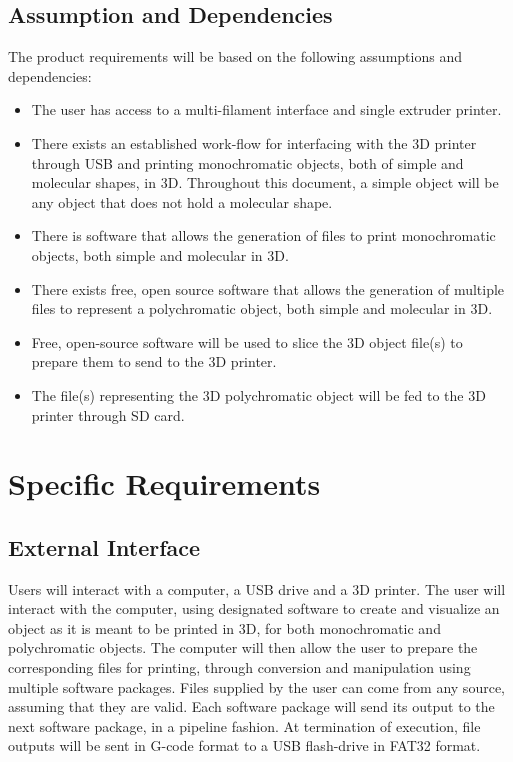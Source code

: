\documentclass[letterpaper, onecolumn, draftclsnofoot, 10pt, compsoc]{IEEEtran}
\begin{document}
\subsection{Assumption and Dependencies} %
The product requirements will be based on the following assumptions and dependencies: 
\begin{itemize}
 \item The user has access to a multi-filament interface and single extruder printer.
  \item There exists an established work-flow for interfacing with the 3D printer through USB and printing monochromatic objects, both of simple and molecular shapes, in 3D. Throughout this document, a simple object will be any object that does not hold a molecular shape.
  \item There is software that allows the generation of files to print monochromatic objects, both simple and molecular in 3D.
  \item There exists free, open source software that allows the generation of multiple files to represent a polychromatic object, both simple and molecular in 3D.
  \item Free, open-source software will be used to slice the 3D object file(s) to prepare them to send to the 3D printer. 
  \item The file(s) representing the 3D polychromatic object will be fed to the 3D printer through SD card. 
\end{itemize}

\section{Specific Requirements} %
	\subsection{External Interface}
   	Users will interact with a computer, a USB drive and a 3D printer. 
     The user will interact with the computer, using designated software to create and visualize an object as it is meant to be printed in 3D, for both monochromatic and polychromatic objects. 
    The computer will then allow the user to prepare the corresponding files for printing, through conversion and manipulation using multiple software packages.
    Files supplied by the user can come from any source, assuming that they are valid. 
    Each software package will send its output to the next software package, in a pipeline fashion.
    At termination of execution, file outputs will be sent in G-code format to a USB flash-drive in FAT32 format.
    
\end{document}
